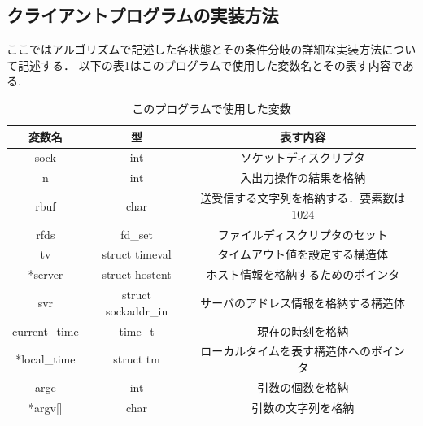 \documentclass[dvipdfmx]{jarticle}
\begin{document}
\subsection{クライアントプログラムの実装方法}
ここではアルゴリズムで記述した各状態とその条件分岐の詳細な実装方法について記述する．
以下の表1はこのプログラムで使用した変数名とその表す内容である.
\clearpage
\begin{table}[h]
    \centering
    \begin{tabular}{|c|c|c|}
        \hline
        変数名 & 型 & 表す内容\\\hline\hline
        sock & int & ソケットディスクリプタ\\\hline
        n & int & 入出力操作の結果を格納\\\hline
        rbuf & char & 送受信する文字列を格納する．要素数は1024\\\hline
        rfds & fd\_set & ファイルディスクリプタのセット\\\hline
        tv & struct timeval & タイムアウト値を設定する構造体\\\hline
        *server & struct hostent & ホスト情報を格納するためのポインタ\\\hline
        svr & struct sockaddr\_in & サーバのアドレス情報を格納する構造体\\\hline
        current\_time & time\_t & 現在の時刻を格納\\\hline
        *local\_time & struct tm & ローカルタイムを表す構造体へのポインタ\\\hline
        argc & int & 引数の個数を格納\\\hline
        *argv[] & char & 引数の文字列を格納\\\hline
    \end{tabular}
    \caption{このプログラムで使用した変数}
\end{table}
\end{document}
